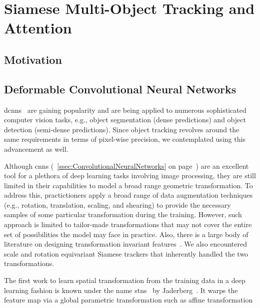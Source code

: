 \section{Siamese Multi-Object Tracking and Attention}
\label{sec:SiamMOTandAttention}

\subsection{Motivation}

\subsection{Deformable Convolutional Neural Networks}
\label{ssec:DeformableCNNS}

\Glspl{dcnn}~\cite{dai2017dcnn} are gaining popularity and are being applied to numerous sophisticated computer vision tasks, e.g., object segmentation (dense predictions) and object detection (semi-dense predictions). Since object tracking revolves around the same requirements in terms of pixel-wise precision, we contemplated using this advancement as well.

Although \glspl{cnn} (\sectionstr{}~\ref{ssec:ConvolutionalNeuralNetworks} on page~\pageref{ssec:ConvolutionalNeuralNetworks}) are an excellent tool for a plethora of deep learning tasks involving image processing, they are still limited in their capabilities to model a broad range geometric transformation. To address this, practictioners apply a broad range of data augmentation techniques (e.g., rotation, translation, scaling, and shearing) to provide the necessary samples of some particular transformation during the training. However, such approach is limited to tailor-made transformations that may not cover the entire set of possibilities the model may face in practice. Also, there is a large body of literature on designing transformation invariant features~\cite{lowe1999sift, rublee2011orb}. We also encountered scale and rotation equivariant Siamese trackers that inherently handled the two transformations.

The first work to learn spatial transformation from the training data in a deep learning fashion is known under the name \glspl{stn}~\cite{jaderberg2016stn} by Jaderberg~\etal{}. It warps the feature map via a global parametric transformation such as affine transformation

